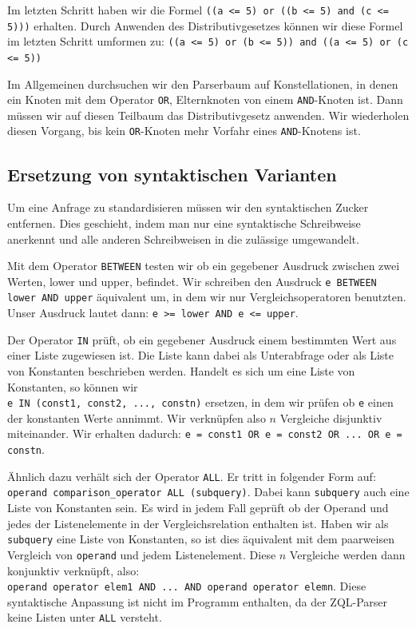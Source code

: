 Im letzten Schritt haben wir die Formel \verb|((a <= 5) or ((b <= 5) and (c <= 5)))| erhalten. Durch Anwenden des Distributivgesetzes können wir diese Formel im letzten Schritt umformen zu: \verb|((a <= 5) or (b <= 5)) and ((a <= 5) or (c <= 5))|

Im Allgemeinen durchsuchen wir den Parserbaum auf Konstellationen, in denen ein Knoten mit dem Operator \verb|OR|, Elternknoten von einem \verb|AND|-Knoten ist. Dann müssen wir auf diesen Teilbaum das Distributivgesetz anwenden. Wir wiederholen diesen Vorgang, bis kein \verb|OR|-Knoten mehr Vorfahr eines \verb|AND|-Knotens ist.

\subsection{Ersetzung von syntaktischen Varianten}

Um eine Anfrage zu standardisieren müssen wir den syntaktischen Zucker entfernen. Dies geschieht, indem man nur eine syntaktische Schreibweise anerkennt und alle anderen Schreibweisen in die zulässige umgewandelt. 

Mit dem Operator \verb|BETWEEN| testen wir ob ein gegebener Ausdruck zwischen zwei Werten, lower und upper, befindet. Wir schreiben den Ausdruck \verb|e BETWEEN lower AND upper| äquivalent um, in dem wir nur Vergleichsoperatoren benutzten. \\Unser Ausdruck lautet dann: \verb|e >= lower AND e <= upper|.

Der Operator \verb|IN| prüft, ob ein gegebener Ausdruck einem bestimmten Wert aus einer Liste zugewiesen ist. Die Liste kann dabei als Unterabfrage oder als Liste von Konstanten beschrieben werden. Handelt es sich um eine Liste von Konstanten, so können wir \\\verb|e IN (const1, const2, ..., constn)| ersetzen, in dem wir prüfen ob \verb|e| einen der konstanten Werte annimmt. Wir verknüpfen also $n$ Vergleiche disjunktiv miteinander. Wir erhalten dadurch: \verb|e = const1 OR e = const2 OR ... OR e = constn|.

Ähnlich dazu verhält sich der Operator \verb|ALL|. Er tritt in folgender Form auf:\\
\verb|operand comparison_operator ALL (subquery)|. Dabei kann \verb|subquery| auch eine Liste von Konstanten sein. Es wird in jedem Fall geprüft ob der Operand und jedes der Listenelemente in der Vergleichsrelation enthalten ist. Haben wir als \verb|subquery| eine Liste von Konstanten, so ist dies äquivalent mit dem paarweisen Vergleich von \verb|operand| und jedem Listenelement. Diese $n$ Vergleiche werden dann konjunktiv verknüpft, also: \\
\verb|operand operator elem1 AND ... AND operand operator elemn|. 
Diese syntaktische Anpassung ist nicht im Programm enthalten, da der ZQL-Parser keine Listen unter \verb|ALL| versteht.

